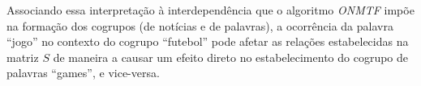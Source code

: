 \documentclass[
    12pt,                %
    oneside,            %
    a4paper,            %
    english,            %
    brazil                %
    ]{abntex2ppgsi}
\begin{document}
Associando essa interpretação à interdependência que o algoritmo \textit{ONMTF} impõe na formação dos cogrupos (de notícias e de palavras), a ocorrência da palavra ``jogo'' no contexto do cogrupo ``futebol'' pode afetar as relações estabelecidas na matriz $S$ de maneira a causar um efeito direto no estabelecimento do cogrupo de palavras ``games'', e vice-versa.


\end{document}
